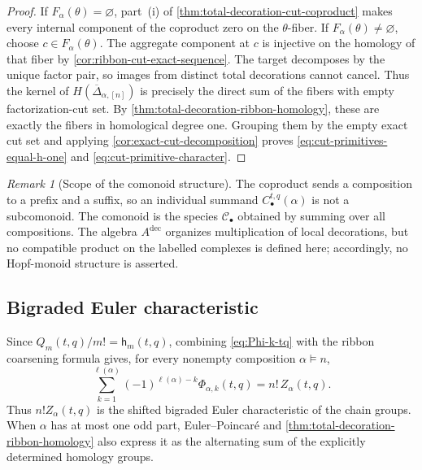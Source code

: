 \documentclass{amsart}
\theoremstyle{definition}
\theoremstyle{remark}
\newtheorem{remark}[remark]{Remark}
\begin{document}
\begin{proof}
If $F_\alpha(\theta)=\varnothing$, part~\textup{(i)} of
\cref{thm:total-decoration-cut-coproduct} makes every internal component of
the coproduct zero on the $\theta$-fiber.  If
$F_\alpha(\theta)\neq\varnothing$, choose $c\in F_\alpha(\theta)$.  The
aggregate component at $c$ is injective on the homology of that fiber by
\cref{cor:ribbon-cut-exact-sequence}.  The target decomposes by the unique
factor pair, so images from distinct total decorations cannot cancel.  Thus
the kernel of $H(\overline\Delta_{\alpha,[n]})$ is precisely the direct sum of
the fibers with empty factorization-cut set.  By
\cref{thm:total-decoration-ribbon-homology}, these are exactly the fibers in
homological degree one.  Grouping them by the empty exact cut set and applying
\cref{cor:exact-cut-decomposition} proves
\eqref{eq:cut-primitives-equal-h-one} and
\eqref{eq:cut-primitive-character}.
\end{proof}

\begin{remark}[Scope of the comonoid structure]
\label{rem:coalgebra-not-fixed-hopf}
The coproduct sends a composition to a prefix and a suffix, so an individual
summand $C_\bullet^{t,q}(\alpha)$ is not a subcomonoid.  The comonoid is the
species $\mathcal C_\bullet$ obtained by summing over all compositions.  The
algebra $A^{\mathrm{dec}}$ organizes multiplication of local decorations, but
no compatible product on the labelled complexes is defined here; accordingly,
no Hopf-monoid structure is asserted.
\end{remark}

\subsection{Bigraded Euler characteristic}

Since $Q_m(t,q)/m!=\mathsf h_m(t,q)$, combining
\eqref{eq:Phi-k-tq} with the ribbon coarsening formula gives, for every
nonempty composition $\alpha\models n$,
\begin{equation}
 \sum_{k=1}^{\ell(\alpha)}
 (-1)^{\ell(\alpha)-k}\Phi_{\alpha,k}(t,q)
 =n!\,Z_\alpha(t,q).
 \label{eq:bigraded-euler}
\end{equation}
Thus $n!Z_\alpha(t,q)$ is the shifted bigraded Euler characteristic of the
chain groups.  When $\alpha$ has at most one odd part, Euler--Poincar\'e and
\cref{thm:total-decoration-ribbon-homology} also express it as the alternating
sum of the explicitly determined homology groups.
\end{document}
